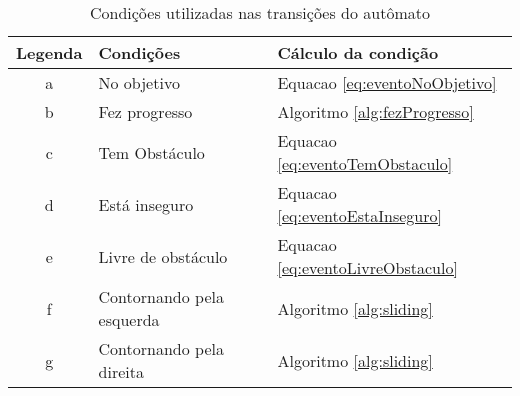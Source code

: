 \begin{table}[ht]
\centering
\caption{Condições utilizadas nas transições do autômato}
\vspace{0.2 cm}
\begin{tabular}{|c|l|l|}
\hline
\textbf{Legenda} & \textbf{Condições}                 & \textbf{Cálculo da condição} \\ \hline
a       & No objetivo               & Equacao \ref{eq:eventoNoObjetivo}            \\ \hline
b       & Fez progresso             & Algoritmo \ref{alg:fezProgresso}            \\ \hline
c       & Tem Obstáculo             & Equacao \ref{eq:eventoTemObstaculo}            \\ \hline
d       & Está inseguro             & Equacao \ref{eq:eventoEstaInseguro}            \\ \hline
e       & Livre de obstáculo        & Equacao \ref{eq:eventoLivreObstaculo}            \\ \hline
f       & Contornando pela esquerda & Algoritmo \ref{alg:sliding}           \\ \hline
g       & Contornando pela direita  & Algoritmo \ref{alg:sliding}            \\ \hline
\end{tabular}
\label{tab:automatoEventos}
\end{table}
